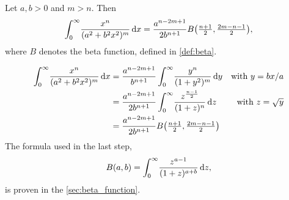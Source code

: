 \begin{Lemma}
  \label{lem:beta_function_formula}
  Let $a, b > 0$ and $m > n$. Then
  \begin{align*}
    \Integ[\infty]{0}{x}{\frac{x^n}{(a^2 + b^2 x^2)^{m}}} =
    \frac{a^{n-2m+1}}{2b^{n+1}}B\bigl(\tfrac{n+1}{2}, \tfrac{2m - n -
    1}{2}\bigr),
  \end{align*}
  where $B$ denotes the beta function, defined in \cref{def:beta}.
  \begin{Proof}
    \begin{align*}
      \Integ[\infty]{0}{x}{\frac{x^n}{(a^2 + b^2 x^2)^{m}}} 
      &= \frac{a^{n-2m+1}}{b^{n+1}} \Integ[\infty]{0}{y}{\frac{y^n}{(1 +
  y^2)^m}}
        &\text{with $y = bx / a$} \\
        &= \frac{a^{n - 2m + 1}}{2b^{n+1}}
        \Integ[\infty]{0}{z}{\frac{z^{\frac{n-1}{2}}}{(1 + z)^n}}
        &\text{with $z = \sqrt{y}$}\\
        &= \frac{a^{n-2m+1}}{2b^{n+1}}B\bigl(\tfrac{n+1}{2}, \tfrac{2m - n -
      1}{2}\bigr)
    \end{align*}
    The formula used in the last step,
    \begin{equation*}
      B(a,b) = \Integ[\infty]{0}{z}{\frac{z^{a-1}}{(1+z)^{a+b}}},
    \end{equation*}
    is proven in the \cref{sec:beta_function}.
  \end{Proof}
\end{Lemma}
